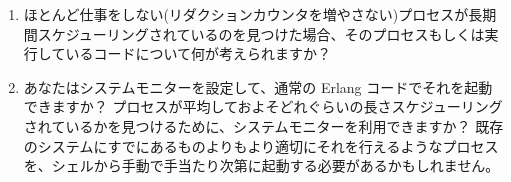 \begin{enumerate}
  \item ほとんど仕事をしない(リダクションカウンタを増やさない)プロセスが長期間スケジューリングされているのを見つけた場合、そのプロセスもしくは実行しているコードについて何が考えられますか？

	\item あなたはシステムモニターを設定して、通常の Erlang コードでそれを起動できますか？ プロセスが平均しておよそどれぐらいの長さスケジューリングされているかを見つけるために、システムモニターを利用できますか？ 既存のシステムにすでにあるものよりもより適切にそれを行えるようなプロセスを、シェルから手動で手当たり次第に起動する必要があるかもしれません。

\end{enumerate}

